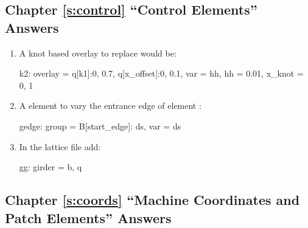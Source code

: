 \documentclass{hitec}     %
\begin{document}
\subsection[Chapter \ref*{s:control.ex} ``Control Elements'']{Chapter \hyperref[s:control.ex]{\ref*{s:control}} ``Control Elements'' Answers}
\label{s:ans.control}

\begin{enumerate}[label=\ref*{s:control}.\arabic{enumi}]
\item
A knot based overlay to replace  would be:
\begin{code}
k2: overlay = {q[k1]:{0, 0.7}, q[x_offset]:{0, 0.1}}, 
                      var = {hh}, hh = 0.01, x_knot = {0, 1}
\end{code}
%
\item
A  element to vary the entrance edge of element :
\begin{code}
gedge: group = {B[start_edge]: ds}, var = {ds}
\end{code}
%
\item
In the  lattice file add:
\begin{code}
gg: girder = {b, q}
\end{code}
\end{enumerate}

\subsection[Chapter \ref*{s:coords.ex} ``Machine Coordinates and Patch Elements'']{Chapter \hyperref[s:coords.ex]{\ref*{s:coords}} ``Machine Coordinates and Patch Elements'' Answers}
\label{s:ans.coords}
\end{document}
